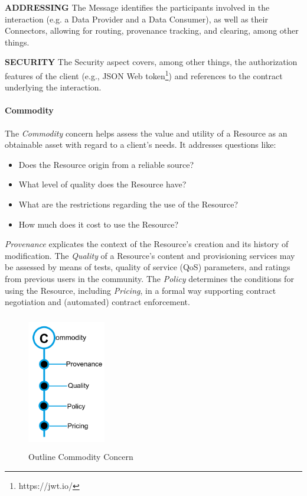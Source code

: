 

\textbf{ADDRESSING }The Message identifies the participants involved in the interaction (e.g. a Data Provider and a Data Consumer), as well as their Connectors, allowing for routing, provenance tracking, and clearing, among other things.

\textbf{SECURITY} The Security aspect covers, among other things, the authorization features of the client (e.g., JSON Web token\footnote{https://jwt.io/ }) and references to the contract underlying the interaction. 

\paragraph{Commodity\\}


The \textit{Commodity} concern helps assess the value and utility of a Resource as an obtainable asset with regard to a client’s needs. It addresses questions like:
 \begin{itemize}
	\item Does the Resource origin from a reliable source? 
 	\item What level of quality does the Resource have? 
 	\item What are the restrictions regarding the use of the Resource? 
 	\item How much does it cost to use the Resource?
\end{itemize} 
 \textit{Provenance} explicates the context of the Resource’s creation and its history of modification. The \textit{Quality} of a Resource’s content and provisioning services may be assessed by means of tests, quality of service (QoS) parameters, and ratings from previous users in the community. The \textit{Policy }determines the conditions for using the Resource, including \textit{Pricing}, in a formal way supporting contract negotiation and (automated) contract enforcement. 

\begin{figure}[H]
	\begin{Center}
		\includegraphics[width=1.34in,height=2.33in]{./media/image43.png}
		\caption{Outline Commodity Concern}
		\label{fig:outline_commodity_concern}
	\end{Center}
\end{figure}


